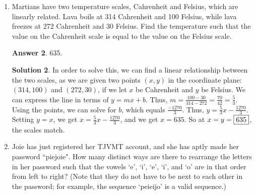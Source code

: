 \documentclass[11pt]{article}
\theoremstyle{definition}
\newtheorem*{solution}{Solution}
\newtheorem*{answer}{Answer}
\begin{document}
\begin{enumerate}
\begin{answer}
$98\pi + 20$.
\end{answer}
\begin{solution}
 We find the areas of the top and bottom surfaces by subtracting the area of the smaller semicircle from the larger semicircle, and we find that the sum of the top and bottom areas is $2 \cdot \frac{1}{2} \cdot (8^2\pi - 6^2\pi) = 28\pi$. The sum of the areas of the rectangles is $2 \cdot 10 = 20$.
To find the area of the inner curve, notice that if the inner curve is unraveled, it becomes a rectangle. The height of the rectangle is 5, and the length is  $\frac{1}{2}(2r\pi) = 6\pi$. Thus, the area of the inner curve is $5 \cdot 6\pi = 30\pi$.
The area of the outer curve can be computed similarly. The height of the rectangle is 5, and the length is $ \frac{1}{2}(2r\pi) = 8\pi$, so the area is $5 \cdot 8\pi = 40\pi$. Therefore the total surface area is $28\pi + 20 + 30\pi + 40\pi = \framebox{$98\pi + 20$}$.
\end{solution}

\item %
Martians have two temperature scales, Cahrenheit and Felsius, which are linearly related. Lava boils at 314 Cahrenheit and 100 Felsius, while lava freezes at 272 Cahrenheit and 30 Felsius. Find the temperature such that the value on the Cahrenheit scale is equal to the value on the Felsius scale.

\begin{answer}
635.
\end{answer}
\begin{solution}
 In order to solve this, we can find a linear relationship between the two scales, as we are given two points $(x, y)$ in the coordinate plane: $(314, 100)$ and $(272, 30)$, if we let $x$ be Cahrenheit and $y$ be Felsius. We can express the line in terms of $y = mx + b$. Thus, $m = \frac{100-30}{314-272} = \frac{70}{42} = \frac{5}{3}$. Using the points, we can solve for $b$, which equals $\frac{-1270}{3}$. Thus, $y = \frac{5}{3}x - \frac{1270}{3}$. Setting $y = x$, we get $x = \frac{5}{3}x - \frac{1270}{3}$, and we get $x = 635$. So at $x = y = \framebox{635}$, the scales match.
\end{solution}

\item %
Joie has just registered her TJVMT account, and she has aptly made her password ``piejoie". How many distinct ways are there to rearrange the letters in her password such that the vowels `e', `i', `e', `i', and `o' are in that order from left to right? (Note that they do not have to be next to each other in the password; for example, the sequence `peieijo' is a valid sequence.)


\end{enumerate}
\end{document}
